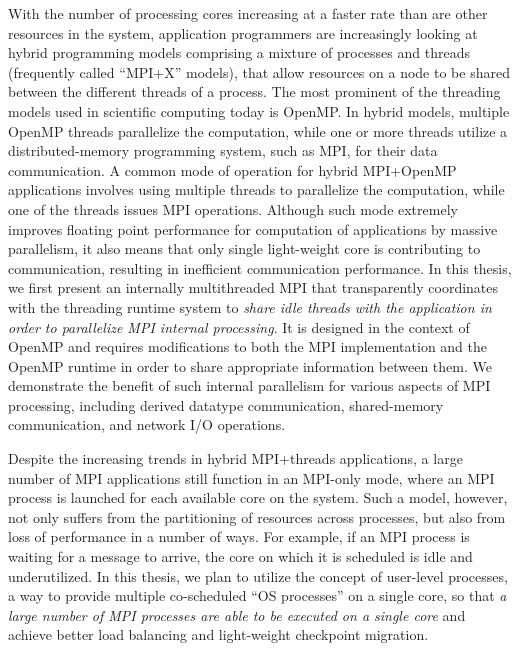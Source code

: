 With the number of processing cores increasing at a faster rate 
than are other resources in the system, application programmers are 
increasingly looking at hybrid programming models comprising a mixture 
of processes and threads (frequently called ``MPI+X'' models), 
that allow resources on a node to be shared between the different 
threads of a process. The most prominent of the threading models used 
in scientific computing today is OpenMP. In hybrid models, multiple OpenMP 
threads parallelize the computation, while one or more threads utilize a 
distributed-memory programming system, such as MPI, for their data 
communication. A common mode of operation for hybrid MPI+OpenMP applications 
involves using multiple threads to parallelize the computation, while one 
of the threads issues MPI operations. Although such mode extremely improves 
floating point performance for computation of applications by massive 
parallelism, it also means that only single light-weight core is contributing 
to communication, resulting in inefficient communication performance. 
In this thesis, we first present an internally multithreaded MPI that 
transparently coordinates with the threading runtime system to \textit{share
idle threads with the application in order to parallelize MPI internal 
processing}. It is designed in the context of OpenMP and requires 
modifications to both the MPI implementation and the OpenMP runtime in 
order to share appropriate information between them. We demonstrate the 
benefit of such internal parallelism for various aspects of MPI processing, 
including derived datatype communication, shared-memory communication, 
and network I/O operations.

Despite the increasing trends in hybrid MPI+threads applications,
a large number of MPI applications still function in an MPI-only 
mode, where an MPI process is launched for each available core on 
the system. Such a model, however, not only suffers from the partitioning 
of resources across processes, but also from loss of performance in a 
number of ways. For example, if an MPI process is waiting for a 
message to arrive, the core on which it is scheduled is idle and 
underutilized. In this thesis, we plan to utilize the concept of user-level 
processes, a way to provide multiple co-scheduled ``OS processes'' on a 
single core, so that \textit{a large number of MPI processes are able 
to be executed on a single core} and achieve better load balancing and 
light-weight checkpoint migration.

